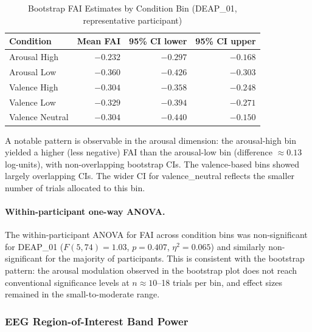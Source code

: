\begin{table}[htbp]
    \centering
    \caption{Bootstrap \gls{FAI} Estimates by Condition Bin (DEAP\_01, representative participant)}
    \label{tab:deap01_fai_bs}
    \begin{tabular}{lrrr}
        \hline
        \textbf{Condition} & \textbf{Mean FAI} & \textbf{95\% CI lower} & \textbf{95\% CI upper} \\
        \hline
        Arousal High  & $-0.232$ & $-0.297$ & $-0.168$ \\
        Arousal Low   & $-0.360$ & $-0.426$ & $-0.303$ \\
        Valence High  & $-0.304$ & $-0.358$ & $-0.248$ \\
        Valence Low   & $-0.329$ & $-0.394$ & $-0.271$ \\
        Valence Neutral & $-0.304$ & $-0.440$ & $-0.150$ \\
        \hline
    \end{tabular}
\end{table}

\noindent A notable pattern is observable in the arousal dimension: the arousal-high bin yielded a higher (less negative) \gls{FAI} than the arousal-low bin (difference $\approx 0.13$ log-units), with non-overlapping bootstrap CIs. The valence-based bins showed largely overlapping CIs. The wider CI for valence\_neutral reflects the smaller number of trials allocated to this bin.

\paragraph{Within-participant one-way \gls{ANOVA}.}
The within-participant \gls{ANOVA} for \gls{FAI} across condition bins was non-significant for DEAP\_01 ($F(5, 74) = 1.03$, $p = 0.407$, $\eta^2 = 0.065$) and similarly non-significant for the majority of participants. This is consistent with the bootstrap pattern: the arousal modulation observed in the bootstrap plot does not reach conventional significance levels at $n \approx 10$--18 trials per bin, and effect sizes remained in the small-to-moderate range.


\subsubsection{EEG Region-of-Interest Band Power}

